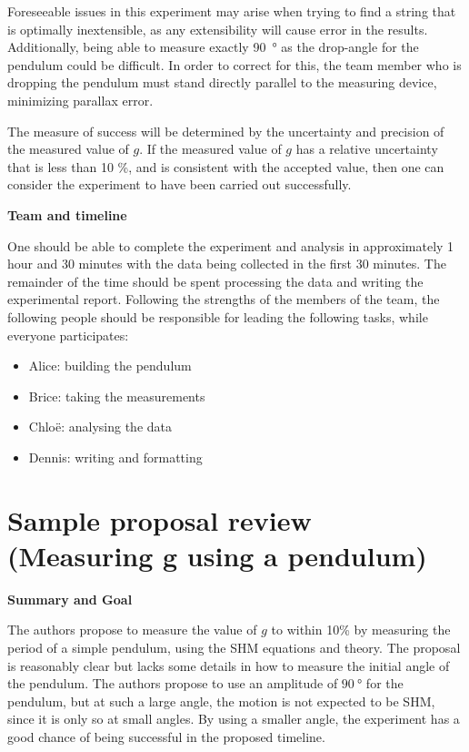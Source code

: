  Foreseeable issues in this experiment may arise when trying to find a string that is optimally inextensible, as any extensibility will cause error in the results. Additionally, being able to measure exactly \SI{90}{\degree} as the drop-angle for the pendulum could be difficult. In order to correct for this, the team member who is dropping the pendulum must stand directly parallel to the measuring device, minimizing parallax error. 

The measure of success will be determined by the uncertainty and precision of the measured value of $g$. If the measured value of $g$ has a relative uncertainty that is less than 10 \%, and is consistent with the accepted value, then one can consider the experiment to have been carried out successfully. 

\textbf{Team and timeline}

One should be able to complete the experiment and analysis in approximately 1 hour and 30 minutes with the data being collected in the first 30 minutes. The remainder of the time should be spent processing the data and writing the experimental report.  
Following the strengths of the members of the team, the following people should be responsible for leading the following tasks, while everyone participates:

\begin{itemize}
\item Alice: building the pendulum
\item Brice: taking the measurements
\item Chlo\"e: analysing the data
\item Dennis: writing and formatting
\end{itemize}


\newpage
\section{Sample proposal review (Measuring g using a pendulum)}
 \vspace{0.25cm}
\textbf{Summary and Goal}

The authors propose to measure the value of $g$ to within 10\% by measuring the period of a simple pendulum, using the SHM equations and theory. The proposal is reasonably clear but lacks some details in how to measure the initial angle of the pendulum. The authors propose to use an amplitude of $\SI{90}{\degree}$ for the pendulum, but at such a large angle, the motion is not expected to be SHM, since it is only so at small angles. By using a smaller angle, the experiment has a good chance of being successful in the proposed timeline.

